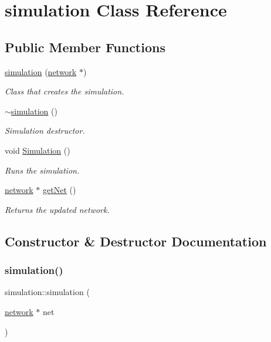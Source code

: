 \hypertarget{classsimulation}{}\section{simulation Class Reference}
\label{classsimulation}
\subsection*{Public Member Functions}
\begin{DoxyCompactItemize}
\item 
\hyperlink{classsimulation_a56f62a4474398476661e7fadf4e8addd}{simulation} (\hyperlink{classnetwork}{network} $\ast$)
\begin{DoxyCompactList}\small\item\em Class that creates the simulation. \end{DoxyCompactList}\item 
\hyperlink{classsimulation_ac84df84c712163d5378db4b4fe62bc98}{$\sim$simulation} ()
\begin{DoxyCompactList}\small\item\em Simulation destructor. \end{DoxyCompactList}\item 
void \hyperlink{classsimulation_a56832e923bc907f588e5268b9423a57e}{Simulation} ()
\begin{DoxyCompactList}\small\item\em Runs the simulation. \end{DoxyCompactList}\item 
\hyperlink{classnetwork}{network} $\ast$ \hyperlink{classsimulation_a9bde1d986780e0980d1de6c57d814532}{get\+Net} ()
\begin{DoxyCompactList}\small\item\em Returns the updated network. \end{DoxyCompactList}\end{DoxyCompactItemize}


\subsection{Constructor \& Destructor Documentation}
\mbox{\label{classsimulation_a56f62a4474398476661e7fadf4e8addd}} 
\subsubsection{\texorpdfstring{simulation()}{simulation()}}
{\footnotesize\ttfamily simulation\+::simulation (\begin{DoxyParamCaption}\item[{\hyperlink{classnetwork}{network} $\ast$}]{net }\end{DoxyParamCaption})}



